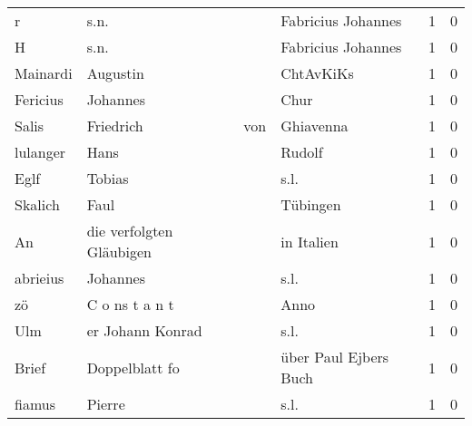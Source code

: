 \documentclass[10pt,a4paper,landscape]{article}
\begin{document}
\begin{longtable}{llllrr}
                        r &                               s.n. &             &                          Fabricius Johannes &          1 &         0 \\
                        H &                               s.n. &             &                          Fabricius Johannes &          1 &         0 \\
                 Mainardi &                           Augustin &             &                                   ChtAvKiKs &          1 &         0 \\
                 Fericius &                           Johannes &             &                                        Chur &          1 &         0 \\
                    Salis &                          Friedrich &         von &                                   Ghiavenna &          1 &         0 \\
                 lulanger &                               Hans &             &                                      Rudolf &          1 &         0 \\
                     Eglf &                             Tobias &             &                                        s.l. &          1 &         0 \\
                  Skalich &                               Faul &             &                                    Tübingen &          1 &         0 \\
                       An &           die verfolgten Gläubigen &             &                                  in Italien &          1 &         0 \\
                 abrieius &                           Johannes &             &                                        s.l. &          1 &         0 \\
                       zö &                     C o ns t a n t &             &                                        Anno &          1 &         0 \\
                      Ulm &                   er Johann Konrad &             &                                        s.l. &          1 &         0 \\
                    Brief &                     Doppelblatt fo &             &                       über Paul Ejbers Buch &          1 &         0 \\
                   fiamus &                             Pierre &             &                                        s.l. &          1 &         0 \\

\end{longtable}
\end{document}
